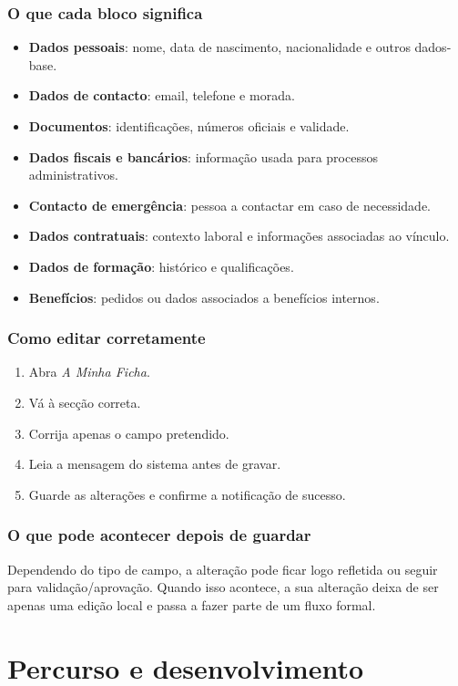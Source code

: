 \subsection{O que cada bloco significa}
\begin{itemize}
  \item \textbf{Dados pessoais}: nome, data de nascimento, nacionalidade e outros dados-base.
  \item \textbf{Dados de contacto}: email, telefone e morada.
  \item \textbf{Documentos}: identificações, números oficiais e validade.
  \item \textbf{Dados fiscais e bancários}: informação usada para processos administrativos.
  \item \textbf{Contacto de emergência}: pessoa a contactar em caso de necessidade.
  \item \textbf{Dados contratuais}: contexto laboral e informações associadas ao vínculo.
  \item \textbf{Dados de formação}: histórico e qualificações.
  \item \textbf{Benefícios}: pedidos ou dados associados a benefícios internos.
\end{itemize}

\subsection{Como editar corretamente}
\begin{enumerate}
  \item Abra \textit{A Minha Ficha}.
  \item Vá à secção correta.
  \item Corrija apenas o campo pretendido.
  \item Leia a mensagem do sistema antes de gravar.
  \item Guarde as alterações e confirme a notificação de sucesso.
\end{enumerate}

\subsection{O que pode acontecer depois de guardar}
Dependendo do tipo de campo, a alteração pode ficar logo refletida ou seguir para validação/aprovação. Quando isso acontece, a sua alteração deixa de ser apenas uma edição local e passa a fazer parte de um fluxo formal.

\chapter{Percurso e desenvolvimento}
